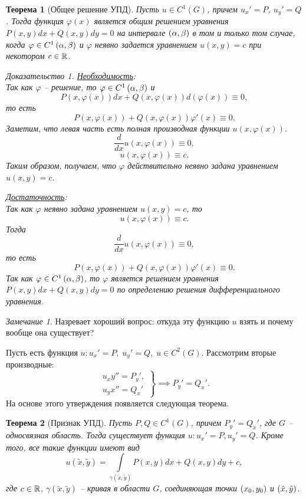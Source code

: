 \documentclass[a5paper, 10pt]{article}
\theoremstyle{definition}
\theoremstyle{plain}
\newtheorem{Th}{Теорема}
\theoremstyle{remark}
\newtheorem*{Note}{Замечание}
\newtheorem*{Proof}{Доказательство}
\begin{document}
	\begin{Th}[Общее решение УПД]
		Пусть $u \in C^1 (G)$, причем $u_x'=P$, $u_y'=Q$. Тогда функция $\varphi(x)$ является общим решением уравнения $P(x,y)dx + Q(x,y)dy = 0$ на интервале $\left(\alpha, \beta\right)$ в том и только том случае, когда $\varphi \in C^{1} \left(\alpha,\beta\right)$ и $\varphi$ неявно задается уравнением $u(x,y) = c$ при некотором $c\in \mathbb{R}$.
		\begin{Proof}
			\underline{Необходимость}:\\
			Так как $\varphi$ -- решение, то $\varphi \in C^{1} \left(\alpha,\beta\right)$ и 
			\[
			P(x,\varphi(x))dx + Q(x,\varphi(x))d(\varphi(x)) \equiv 0,
			\]
			то есть 
			\[
			P(x,\varphi(x)) + Q(x,\varphi(x))\varphi'(x) \equiv 0.
			\]
			Заметим, что левая часть есть полная производная функции $u(x, \varphi(x))$.
			\[
			\frac{d}{dx} u(x,\varphi(x)) \equiv 0,
			\]
			\[
			u(x, \varphi(x)) \equiv c.
			\]
			Таким образом, получаем, что $\varphi$ действительно неявно задана уравнением $u(x,y)=c$.
			
			\underline{Достаточность}:\\
			Так как $\varphi$ неявно задана уравнением $u(x,y)=c$, то 
			\[
			u(x, \varphi(x)) \equiv c.
			\]
			Тогда \[
			\frac{d}{dx} u(x,\varphi(x)) \equiv 0,
			\]
			то есть 
			\[
			P(x,\varphi(x)) + Q(x,\varphi(x))\varphi'(x) \equiv 0.
			\]
			Так как $\varphi \in C^{1} \left(\alpha,\beta\right)$, то $\varphi$ является решением уравнения $P(x,y)dx + Q(x,y)dy = 0$ по определению решения дифференциального уравнения.
		\end{Proof}
	\end{Th}

	\begin{Note}
	Назревает хороший вопрос: откуда эту функцию $u$ взять и почему вообще она существует?
	
	Пусть есть функция $u: u_x'=P, \; u_y' = Q, \; u\in C^2(G)$. Рассмотрим вторые производные:
	\[
	\left.
	\begin{split}
		u_xy''=P_y', \\
		u_yx'' = Q_x'
	\end{split}
	\right\} \implies P_y' = Q_x'.
	\]
	На основе этого утверждения появляется следующая теорема.
	\end{Note}
	
	\begin{Th}[Признак УПД]
		Пусть $P, Q \in C^1(G)$, причем $P_y' = Q_x'$, где $G$ -- односвязная область.
		Тогда существует функция $u : u_x' = P, u_y' = Q$. Кроме того, все такие функции имеют вид 
		\[
		u(\tilde{x}, \tilde{y}) = \int\limits_{\gamma(\tilde{x}, \tilde{y})} P(x,y)dx + Q(x,y)dy + c,
		\]
		где $c \in \mathbb{R}$, $\gamma(\tilde{x}, \tilde{y})$ -- кривая в области $G$, соединяющая точки $\left(x_0,y_0\right)$ и $\left(\tilde{x}, \tilde{y}\right)$.
	\end{Th}
	
\end{document}
